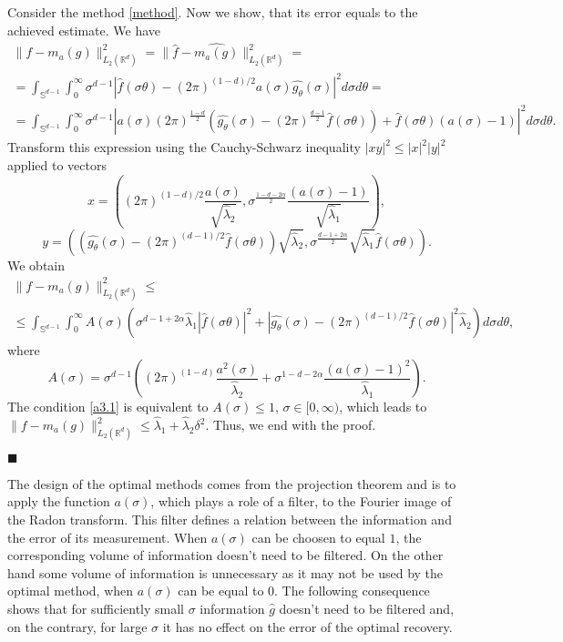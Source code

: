 \documentclass[12pt]{iopart}
\newenvironment{proof}
{\par\noindent{\bf Proof}}
{\hfill$\scriptstyle\blacksquare$}
\begin{document}
\begin{proof}
Consider the method \eqref{method}. Now we show, that its error equals to the achieved estimate.
We have
\begin{multline*}
  \|f-m_a(g)\|^2_{L_2(\mathbb R^d)}=\|\widehat f-\widehat{m_a(g)}\|^2_{L_2(\mathbb R^d)}=\\
  =\int_{\mathbb S^{d-1}}\int_0^\infty\sigma^{d-1}|\widehat f(\sigma\theta )-(2\pi)^{(1-d)/2}a(\sigma)\widehat{g_\theta }(\sigma)|^2d\sigma d\theta =\\
  =\int_{\mathbb
    S^{d-1}}\int_0^\infty\sigma^{d-1}\left|a(\sigma)(2\pi)^{\frac{1-d}{2}}\left(\widehat{g_\theta }(\sigma)-(2\pi)^{\frac{d-1}{2}}\widehat 
      f(\sigma\theta )\right)+\widehat
    f(\sigma\theta )(a(\sigma)-1)\right|^2d\sigma d\theta .
\end{multline*}
Transform this expression using the Cauchy-Schwarz inequality $|xy|^2\leqslant |x|^2|y|^2$ applied to vectors
\[
x=\left((2\pi)^{(1-d)/2}\frac{a(\sigma)}{\sqrt{\widehat\lambda_2}},\sigma^{\frac{1-d-2\alpha}{2}}\frac{(a(\sigma)-1)}{\sqrt{\widehat\lambda_1}}\right),
\]
\[
y=\left(\left(\widehat{g_\theta }(\sigma)-(2\pi)^{(d-1)/2}\widehat
    f(\sigma\theta )\right)\sqrt{\widehat\lambda_2},\sigma^{\frac{d-1+2\alpha}{2}}\sqrt{\widehat\lambda_1}\widehat
  f(\sigma\theta )\right).
\]
We obtain
\begin{multline*}  
  \|f-m_a(g)\|^2_{L_2(\mathbb R^d)}\leqslant  \\
  \leqslant \int_{\mathbb S^{d-1}}\int_0^\infty
  A(\sigma)\left(\sigma^{d-1+2\alpha}\widehat\lambda_1|\widehat
    f(\sigma\theta )|^2+\left|\widehat{g_\theta
      }(\sigma)-(2\pi)^{(d-1)/2}\widehat f(\sigma\theta
      )\right|^2\widehat\lambda_2\right)d\sigma d\theta ,
\end{multline*}
where
  \[
  A(\sigma)=\sigma^{d-1}\left((2\pi)^{(1-d)}\frac{a^2(\sigma)}{\widehat\lambda_2}+\sigma^{1-d-2\alpha}\frac{(a(\sigma)-1)^2}{\widehat\lambda_1}\right).
  \]
  The condition \eqref{a3.1} is equivalent to $A(\sigma)\leqslant 1$, $\sigma\in
  [0,\infty )$, which leads to $ \|f-m_a(g)\|^2_{L_2(\mathbb R^d)}\leqslant
  \widehat\lambda_1+\widehat\lambda_2\delta^2.$
Thus, we end with the proof.

\end{proof}

The design of the optimal methods comes from the projection theorem and is to apply the function $a(\sigma)$, which plays a role of a filter, to the Fourier image of the Radon transform. This filter defines a relation between the information and the error of its measurement. When $a(\sigma)$ can be choosen to equal $1$, the corresponding volume of information doesn't need to be filtered. On the other hand some volume of information is unnecessary as it may not be used by the optimal method, when $a(\sigma)$ can be equal to $0$. The following consequence shows that for sufficiently small  $\sigma$ information $\hat g$ doesn't need to be filtered and, on the contrary, for large  $\sigma$ it has no effect on the error of the optimal recovery.
\end{document}
